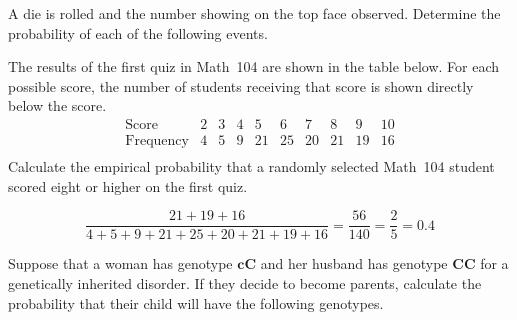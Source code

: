\documentclass[answers,addpoints,12pt]{exam}
\begin{document}
\begin{questions}

\question[15] A die is rolled and the number
showing on the top face observed. Determine the probability
of each of the following events.
\ifprintanswers\else\newpage\fi

\question[10] The results of the first quiz in Math~104 are
shown in the table below. For each possible score, the number
of students receiving that score is shown directly below
the score.
\[\begin{array}{c|cccccccccc}
\text{Score}&2&3&4&5&6&7&8&9&10\\\hline
\text{Frequency}&4&5&9&21&25&20&21&19&16\\
\end{array}\]
Calculate the empirical probability that a randomly
selected Math~104 student scored eight or higher
on the first quiz.
\begin{solution}[2in]
\[\frac{21+19+16}{4+5+9+21+25+20+21+19+16}
=\frac{56}{140}=\frac{2}{5}=0.4\]
\end{solution}

\question[15] Suppose that a woman has genotype $\mathbold{cC}$
and her husband has genotype $\mathbold{CC}$ for a
genetically inherited disorder.
If they decide to become parents, calculate the
probability that their child will
have the following genotypes.
\end{questions}
\end{document}
